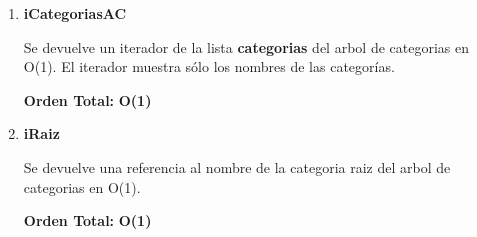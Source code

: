 \vspace*{1em}
\begin{enumerate}







\item\textbf{iCategoriasAC}
\par Se devuelve un iterador de la lista \textbf{categorias} del arbol de categorias en O(1). El iterador muestra sólo los nombres de las categorías.
\par \textbf{Orden Total:} \textbf{O(1)}

\item\textbf{iRaiz}
\par Se devuelve una referencia al nombre de la categoria raiz del arbol de categorias en O(1).
\par \textbf{Orden Total:} \textbf{O(1)}


\end{enumerate}
